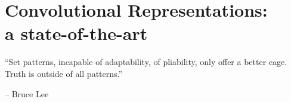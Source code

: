 \documentclass[../thesis.tex]{subfiles}
\begin{document}
\def\crossref{}
\def\biblio{}
\let\csection\section
\let\csubsection\subsection


\chapter[Convolutional Representations]{Convolutional Representations:\\a state-of-the-art}
\label{chap:csc}

\epigraph{``Set patterns, incapable of adaptability, of pliability, only offer a better cage. Truth is outside of all patterns.''}{-- Bruce Lee}


\startcontents[chap]











\stopcontents[chap]

\cbiblio{}
\end{document}
